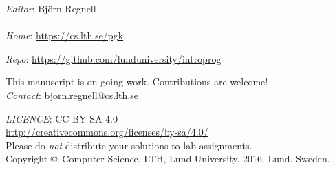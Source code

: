 
\clearpage\null\thispagestyle{empty}
\vfill

{
\setlength{\parindent}{0pt}
\emph{Editor}: Björn Regnell \\ 


\\

\emph{Home}: \url{https://cs.lth.se/pgk} \\ \newline

\emph{Repo}: \url{https://github.com/lunduniversity/introprog} \\ \newline


This manuscript is on-going work. Contributions are welcome! \\ 
\emph{Contact}: \url{bjorn.regnell@cs.lth.se}
\\ \newline

\emph{LICENCE}: CC BY-SA 4.0 \\
\url{http://creativecommons.org/licenses/by-sa/4.0/} \\
Please do \emph{not} distribute your solutions to lab assignments. 
\\ \newline
Copyright \copyright~Computer Science, LTH, Lund University. 2016. Lund. Sweden.\\
}